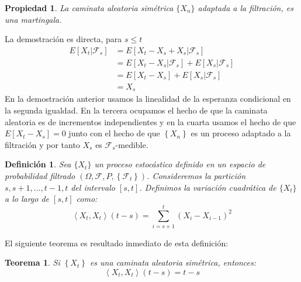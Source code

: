 \documentclass{extreport}
\makeatletter
\theoremstyle{definicion}
\newtheorem{definition}{Definición}[chapter]
\theoremstyle{propiedad}
\newtheorem{propiedad}{Propiedad}[chapter]
\theoremstyle{teorema}
\newtheorem{teorema}{Teorema}[chapter]
\renewenvironment{proof}[1][\proofname]{\par
    \pushQED{\qed}%
    \normalfont \topsep6\p@\@plus6\p@\relax
    \trivlist
    \item\relax
            {\itshape
        #1\@addpunct{.}}\hspace\labelsep\ignorespaces
}{%
    \popQED\endtrivlist\@endpefalse
}
\makeatother
\begin{document}
\begin{propiedad}
    La caminata aleatoria simétrica $\{X_n\}$ adaptada a la filtración, es una martingala.
\end{propiedad}
\begin{proof}
    La demostración es directa, para $s\leq t$
    \begin{equation*}
        \begin{split}
            E\left[X_t\vert \mathcal{F}_s\right] & = E\left[X_t-X_s + X_s\vert\mathcal{F}_s\right]\\
                                                 & = E\left[X_t-X_s\vert\mathcal{F}_s\right] + E\left[X_s\vert\mathcal{F}_s\right]\\
                                                 & = E\left[X_t-X_s\right] + E\left[X_s\vert\mathcal{F}_s\right]\\
                                                 & = X_s
        \end{split}
    \end{equation*}
\end{proof}
En la demostración anterior usamos la linealidad de la esperanza condicional en la segunda igualdad. En la tercera ocupamos el hecho de que la caminata aleatoria es de incrementos independientes y en la cuarta usamos el hecho de que $E[X_t-X_s] = 0$ junto con el hecho de que $\left\{X_n\right\}$ es un proceso adaptado a la filtración y por tanto $X_s$ es $\mathcal{F}_s$-medible.
\begin{definition}
    Sea $\{X_t\}$ un proceso estocástico definido en un espacio de probabilidad filtrado $(\Omega, \mathcal{F}, P, \left\{\mathcal{F}_t\right\})$. Consideremos la partición $s,s+1, \ldots, t-1, t $  del intervalo $[s, t]$. Definimos la \emph{variación cuadrática} de $\{X_t\}$ a lo largo de $[s,t]$ como:
    \begin{equation}
        \left\langle X_t, X_t\right\rangle(t-s) = \sum_{i=s+1}^t \left(X_{i} - X_{i-1}\right)^2
        \label{varquad:1}
    \end{equation}
\end{definition}
El siguiente teorema es resultado inmediato de esta definición:
\begin{teorema}
    Si $\left\{X_t\right\}$ es una caminata aleatoria simétrica, entonces:
        \begin{equation}
        \left\langle X_t, X_t\right\rangle(t-s) = t-s
        \label{varquad:rw}
    \end{equation}
\end{teorema}
\end{document}
